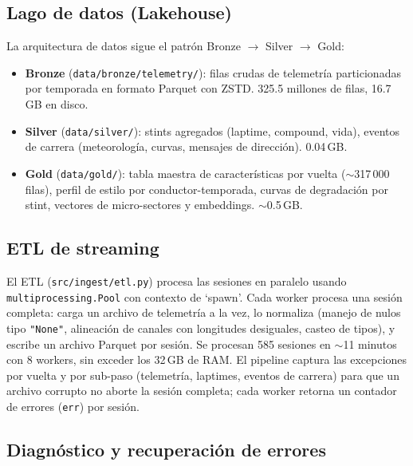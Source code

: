 \documentclass[conference]{IEEEtran}
\begin{document}
\subsection{Lago de datos (Lakehouse)}

La arquitectura de datos sigue el patrón Bronze $\to$ Silver $\to$ Gold:

\begin{itemize}
  \item \textbf{Bronze} (\texttt{data/bronze/telemetry/}): filas crudas de
        telemetría particionadas por temporada en formato Parquet con ZSTD.
        325.5 millones de filas, 16.7\,GB en disco.
  \item \textbf{Silver} (\texttt{data/silver/}): stints agregados (laptime,
        compound, vida), eventos de carrera (meteorología, curvas, mensajes
        de dirección). 0.04\,GB.
  \item \textbf{Gold} (\texttt{data/gold/}): tabla maestra de
        características por vuelta ($\sim$317\,000 filas), perfil de estilo
        por conductor-temporada, curvas de degradación por stint,
        vectores de micro-sectores y embeddings. $\sim$0.5\,GB.
\end{itemize}

\subsection{ETL de streaming}

El ETL (\texttt{src/ingest/etl.py}) procesa las sesiones en paralelo usando
\texttt{multiprocessing.Pool} con contexto de `spawn'. Cada worker procesa
una sesión completa: carga un archivo de telemetría a la vez, lo normaliza
(manejo de nulos tipo \texttt{"None"}, alineación de canales con longitudes
desiguales, casteo de tipos), y escribe un archivo Parquet por sesión.
Se procesan 585 sesiones en $\sim$11 minutos con 8 workers, sin exceder
los 32\,GB de RAM. El pipeline captura las excepciones por vuelta y por
sub-paso (telemetría, laptimes, eventos de carrera) para que un archivo
corrupto no aborte la sesión completa; cada worker retorna un contador de
errores (\texttt{err}) por sesión.

\subsection{Diagnóstico y recuperación de errores}
\end{document}
